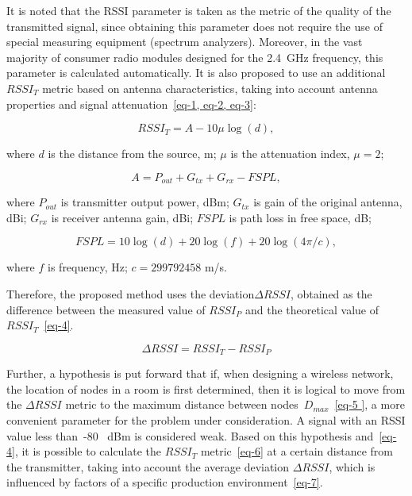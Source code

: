 It is noted that the RSSI parameter is taken as the metric of the quality of the transmitted signal, since obtaining this parameter does not require the use of special measuring equipment (spectrum analyzers). Moreover, in the vast majority of consumer radio modules designed for the \SI{2.4}{\giga \hertz} frequency, this parameter is calculated automatically. It is also proposed to use an additional $RSSI_T$ metric based on antenna characteristics, taking into account antenna properties and signal attenuation~\cref{eq-1, eq-2, eq-3}:

\begin{equation}
RSSI_T = A-10 \mu \log (d),
\label{eq-1}
\end{equation}

\noindent where $d$ is the distance from the source, m; $\mu$ is the attenuation index, $\mu = 2$;

\begin{equation}
A = P_{out} + G_{tx} + G_{rx} -FSPL,
\label{eq-2}
\end{equation}

\noindent where $P_{out}$ is transmitter output power, dBm; $G_{tx}$ is gain of the original antenna, dBi; $G_{rx}$ is receiver antenna gain, dBi; $FSPL$ is path loss in free space, dB;

\begin{equation}
FSPL = 10\log(d) +20 \log (f) +20 \log (4 \pi/c),
\label{eq-3}
\end{equation}

\noindent where $f$ is frequency, Hz; $c = 299792458$ m/s.

Therefore, the proposed method uses the deviation$\Delta RSSI$, obtained as the difference between the measured value of $RSSI_P$ and the theoretical value of $RSSI_T$~\cref{eq-4}.

\begin{equation}
\Delta RSSI = RSSI_T-RSSI_P
\label{eq-4}
\end{equation}

Further, a hypothesis is put forward that if, when designing a wireless network, the location of nodes in a room is first determined, then it is logical to move from the $\Delta RSSI$ metric to the maximum distance between nodes~$D_{max}$~\cref{eq-5 }, a more convenient parameter for the problem under consideration. A signal with an RSSI value less than~-80 \, dBm is considered weak. Based on this hypothesis and~\cref{eq-4}, it is possible to calculate the $RSSI_T$ metric~\cref{eq-6} at a certain distance from the transmitter, taking into account the average deviation $\Delta RSSI$, which is influenced by factors of a specific production environment~\cref{eq-7}.

